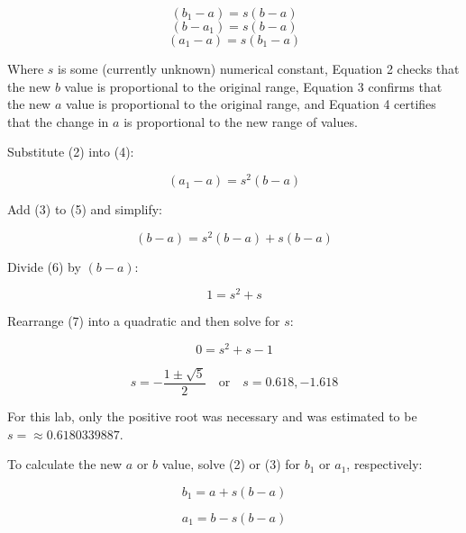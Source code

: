 \documentclass[12pt, letterpaper]{article}
\begin{document}
	 \begin{equation}{(b_1-a)=s(b-a)}\end{equation}
	 \begin{equation}{(b-a_1)=s(b-a)}\end{equation}
	 \begin{equation}{(a_1-a)=s(b_1-a)}\end{equation}
	 
	 Where $s$ is some (currently unknown) numerical constant, Equation 2 checks that the new $b$ value is proportional to the original range, Equation 3 confirms that the new $a$ value is proportional to the original range, and Equation 4 certifies that the change in $a$ is proportional to the new range of values.
	
	Substitute (2) into (4):
	
	\begin{equation}{(a_1-a)=s^2(b-a)}\end{equation}
	
	Add (3) to (5) and simplify:
	
	\begin{equation}{(b-a)=s^2(b-a) + s(b-a)}\end{equation}
	
	Divide (6) by $(b-a)$:
	
	\begin{equation}{1=s^2 + s}\end{equation}
	 
	Rearrange (7) into a quadratic and then solve for $s$:
	
	\begin{equation}{0=s^2 + s - 1}\end{equation}
	
	\begin{equation*}{s=-\frac{1\pm\sqrt{5}}{2}}\quad\text{or}\quad{s=0.618, -1.618}\end{equation*}
	
	For this lab, only the positive root was necessary and  was estimated to be $s=\approx0.6180339887$.
	
	To calculate the new $a$ or $b$ value, solve (2) or (3) for $b_1$ or $a_1$, respectively:
	
	\begin{equation}{b_1=a+s(b-a)}\end{equation}
	
	\begin{equation}{a_1=b-s(b-a)}\end{equation}
\end{document}
